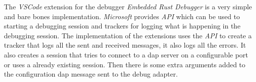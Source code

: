 The \emph{VSCode} extension for the debugger \emph{Embedded Rust Debugger} is a very simple and bare bones implementation.
\emph{Microsoft} provides \emph{API} which can be used to starting a debugging session and trackers for logging what is happening in the debugging session.
The implementation of the extensions uses the \emph{API} to create a tracker that logs all the sent and received messages, it also logs all the errors.
It also creates a session that tries to connect to a \acrshort{dap} server on a configurable port or uses a already existing session.
Then there is some extra arguments added to the configuration \acrshort{dap} message sent to the debug adapter.

